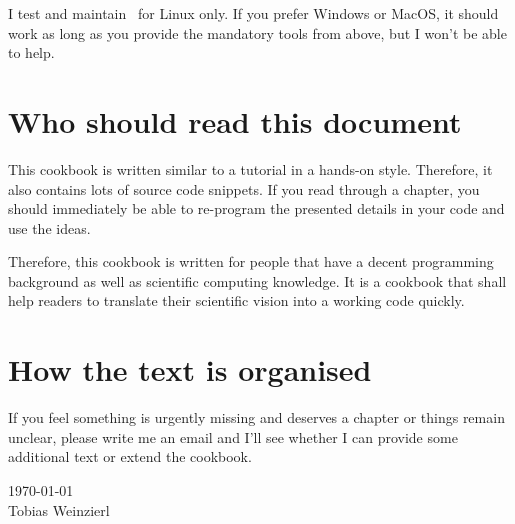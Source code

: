 \begin{remark}
I test and maintain \Peano\  for Linux only.
If you prefer Windows or MacOS, it should work as long as you provide the
mandatory tools from above, but I won't be able to help.
\end{remark}


\section*{Who should read this document}

This cookbook is written similar to a tutorial in a hands-on style.
Therefore, it also contains lots of source code snippets.
If you read through a chapter, you should immediately be able to re-program the
presented details in your code and use the ideas.

Therefore, this cookbook is written for people that have a decent programming
background as well as scientific computing knowledge.
It is a cookbook that shall help readers to translate their scientific vision
into a working code quickly.


\section*{How the text is organised}

If you feel something is urgently missing and deserves a chapter or things
remain unclear, please write me an email and I'll see whether I can provide some
additional text or extend the cookbook.


{
  \flushright
  \today 
  \\ 
  Tobias Weinzierl 
  \\
}

 